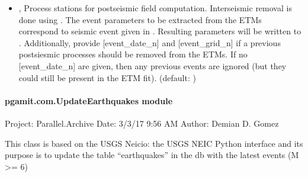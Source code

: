 \documentclass[letterpaper,10pt,english]{sphinxmanual}
\begin{document}
\begin{itemize}
\item {} 
\sphinxAtStartPar
{\hyperref[\detokenize{pgamit.com:TrajectoryFit.py--postseismic}]{}} , {\hyperref[\detokenize{pgamit.com:TrajectoryFit.py---postseismic_process}]{}}  \sphinxhyphen{} Process stations for postseismic field computation. Interseismic removal is done using . The event parameters to be extracted from the ETMs correspond to seismic event given in . Resulting parameters will be written to . Additionally, provide {[}event\_date\_n{]} and {[}event\_grid\_n{]} if a previous postsiesmic processes should be removed from the ETMs. If no {[}event\_date\_n{]} are given, then any previous events are ignored (but they could still be present in the ETM fit). (default: )

\end{itemize}


\paragraph{pgamit.com.UpdateEarthquakes module}
\label{\detokenize{pgamit.com:module-pgamit.com.UpdateEarthquakes}}\label{\detokenize{pgamit.com:pgamit-com-updateearthquakes-module}}
\sphinxAtStartPar
Project: Parallel.Archive
Date: 3/3/17 9:56 AM
Author: Demian D. Gomez

\sphinxAtStartPar
This class is based on the USGS Neicio: the USGS NEIC Python interface and its
purpose is to update the table “earthquakes” in the db with the latest
events (M \textgreater{}= 6)
\end{document}

